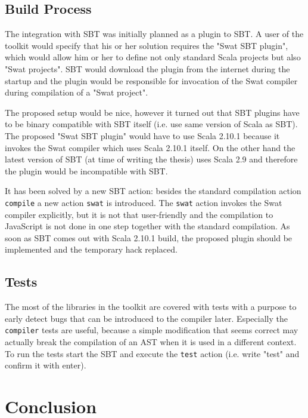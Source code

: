 \documentclass[12pt,a4paper]{report}
\begin{document}
\section{Build Process}

The integration with SBT was initially planned as a plugin to SBT. A user of the toolkit would specify that his or her solution requires the "Swat SBT plugin", which would allow him or her to define not only standard Scala projects but also "Swat projects". SBT would download the plugin from the internet during the startup and the plugin would be responsible for invocation of the Swat compiler during compilation of a "Swat project". 

The proposed setup would be nice, however it turned out that SBT plugins have to be binary compatible with SBT itself (i.e. use same version of Scala as SBT). The proposed "Swat SBT plugin" would have to use Scala 2.10.1 because it invokes the Swat compiler which uses Scala 2.10.1 itself. On the other hand the latest version of SBT (at time of writing the thesis) uses Scala 2.9 and therefore the plugin would be incompatible with SBT.

It has been solved by a new SBT action: besides the standard compilation action \texttt{compile} a new action \texttt{swat} is introduced. The \texttt{swat} action invokes the Swat compiler explicitly, but it is not that user-friendly and the compilation to JavaScript is not done in one step together with the standard compilation. As soon as SBT comes out with Scala 2.10.1 build, the proposed plugin should be implemented and the temporary hack replaced.

\section{Tests}

The most of the libraries in the toolkit are covered with tests with a purpose to early detect bugs that can be introduced to the compiler later. Especially the \texttt{compiler} tests are useful, because a simple modification that seems correct may actually break the compilation of an AST when it is used in a different context. To run the tests start the SBT and execute the \texttt{test} action (i.e. write "test" and confirm it with enter).



\chapter{Conclusion}
\end{document}
